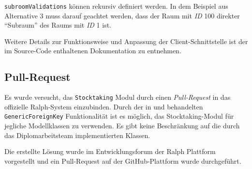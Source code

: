 \begin{Shaded}
\begin{Highlighting}[]
\FunctionTok{\{}
    \FunctionTok{:} \FunctionTok{,}
    \FunctionTok{:} \OtherTok{[}
    \OtherTok{]}\FunctionTok{,}
    \FunctionTok{:} \OtherTok{[}\FunctionTok{\{}
            \FunctionTok{:} \FunctionTok{,}
            \FunctionTok{:} \OtherTok{[}\FunctionTok{\{}
                    \FunctionTok{:} 
                \FunctionTok{\}}
            \OtherTok{]}\FunctionTok{,}
            \FunctionTok{:} \OtherTok{[}
            \OtherTok{]}
        \FunctionTok{\}}
    \OtherTok{]}
\FunctionTok{\}}
\end{Highlighting}
\end{Shaded}

\texttt{subroomValidations} können rekursiv definiert werden. In dem
Beispiel aus Alternative 3 muss darauf geachtet werden, dass der Raum
mit \emph{ID}
100 direkter ``Subraum'' des Raums mit \emph{ID}
1 ist.

Weitere Details zur Funktionsweise und Anpassung der
Client-Schnittstelle ist der im Source-Code enthaltenen Dokumentation zu
entnehmen.

\hypertarget{pull-request}{%
\subsection{Pull-Request}\label{pull-request}}

Es wurde versucht, das \texttt{Stocktaking} Modul durch einen
\emph{Pull-Request}
in das offizielle Ralph-System einzubinden. Durch der in
 und
 behandelten \texttt{GenericForeignKey}
Funktionalität \cite{django-doku-contenttypes} ist es möglich, das
Stocktaking-Modul für jegliche Modellklassen zu verwenden. Es gibt keine
Beschränkung auf die durch das Diplomarbeitsteam implementierten
Klassen.

Die erstellte Lösung wurde im Entwicklungsforum der Ralph Plattform
vorgestellt \cite{ralph-forum-1} \cite{ralph-forum-2} und ein
Pull-Request auf der GitHub-Plattform wurde durchgeführt.
